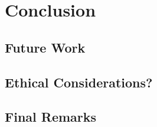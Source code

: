 \chapter{Conclusion}
\section{Future Work}
\section{Ethical Considerations?}
\section{Final Remarks}